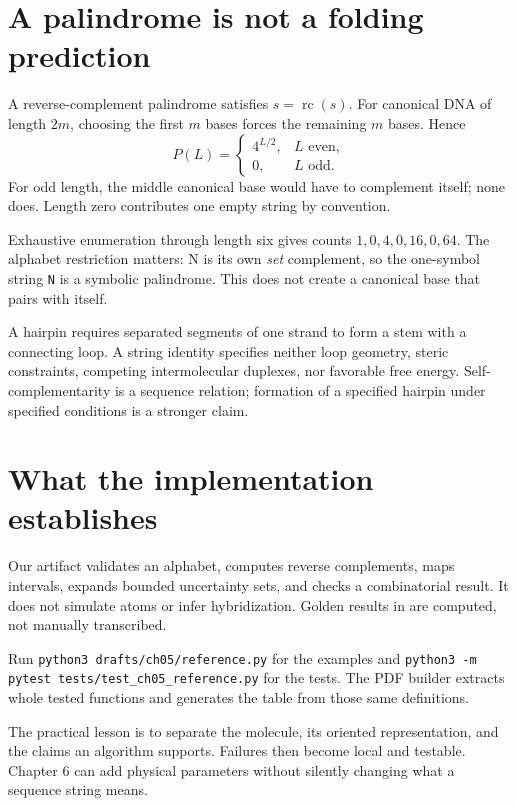 \section{A palindrome is not a folding prediction}

A reverse-complement palindrome satisfies $s=\operatorname{rc}(s)$.
For canonical DNA of length $2m$, choosing the first $m$ bases forces the
remaining $m$ bases. Hence
\begin{equation}
P(L)=
\begin{cases}
4^{L/2},&L\text{ even},\\
0,&L\text{ odd}.
\end{cases}
\label{eq:palindrome}
\end{equation}
For odd length, the middle canonical base would have to complement itself;
none does. Length zero contributes one empty string by convention.


Exhaustive enumeration through length six gives counts
$1,0,4,0,16,0,64$. The alphabet restriction matters: N is its own
\emph{set} complement, so the one-symbol string \texttt{N} is a symbolic
palindrome. This does not create a canonical base that pairs with itself.

A hairpin requires separated segments of one strand to form a stem with a
connecting loop. A string identity specifies neither loop geometry, steric
constraints, competing intermolecular duplexes, nor favorable free energy.
Self-complementarity is a sequence relation; formation of a specified
hairpin under specified conditions is a stronger claim.

\section{What the implementation establishes}

Our artifact validates an alphabet, computes reverse complements, maps
intervals, expands bounded uncertainty sets, and checks a combinatorial
result. It does not simulate atoms or infer hybridization. Golden results
in  are computed, not manually transcribed.

Run \texttt{python3 drafts/ch05/reference.py} for the examples and
\texttt{python3 -m pytest tests/test\_ch05\_reference.py} for the tests.
The PDF builder extracts whole tested functions and generates the table
from those same definitions.

The practical lesson is to separate the molecule, its oriented representation,
and the claims an algorithm supports. Failures then become local and
testable. Chapter 6 can add physical parameters without silently changing
what a sequence string means.

